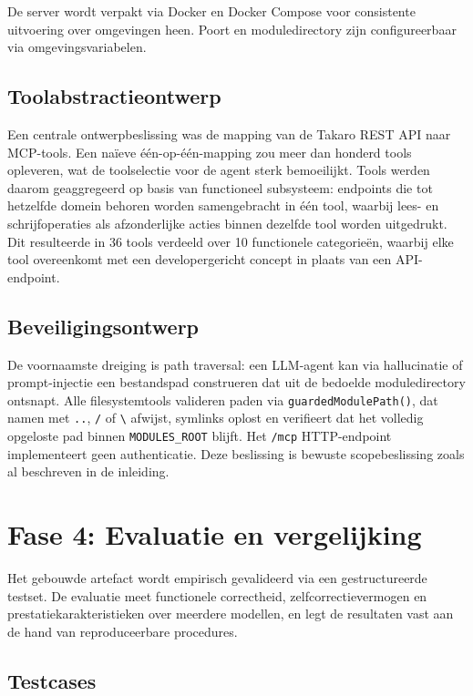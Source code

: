 De server wordt verpakt via Docker en Docker Compose voor consistente uitvoering over omgevingen heen. Poort en moduledirectory zijn configureerbaar via omgevingsvariabelen.

\subsection{Toolabstractieontwerp}\label{subsec:toolontwerp}

Een centrale ontwerpbeslissing was de mapping van de Takaro REST API naar MCP-tools. Een naïeve één-op-één-mapping zou meer dan honderd tools opleveren, wat de toolselectie voor de agent sterk bemoeilijkt. Tools werden daarom geaggregeerd op basis van functioneel subsysteem: endpoints die tot hetzelfde domein behoren worden samengebracht in één tool, waarbij lees- en schrijfoperaties als afzonderlijke acties binnen dezelfde tool worden uitgedrukt. Dit resulteerde in 36 tools verdeeld over 10 functionele categorieën, waarbij elke tool overeenkomt met een developergericht concept in plaats van een API-endpoint.

\subsection{Beveiligingsontwerp}\label{subsec:beveiliging}

De voornaamste dreiging is path traversal: een LLM-agent kan via hallucinatie of prompt-injectie een bestandspad construeren dat uit de bedoelde moduledirectory ontsnapt. Alle filesystemtools valideren paden via \texttt{guardedModulePath()}, dat namen met \texttt{..}, \texttt{/} of \texttt{\textbackslash} afwijst, symlinks oplost en verifieert dat het volledig opgeloste pad binnen \texttt{MODULES\_ROOT} blijft. Het \texttt{/mcp} HTTP-endpoint implementeert geen authenticatie. Deze beslissing is bewuste scopebeslissing zoals al beschreven in de inleiding.

\section{Fase 4: Evaluatie en vergelijking}\label{sec:fase4}

Het gebouwde artefact wordt empirisch gevalideerd via een gestructureerde testset. De evaluatie meet functionele correctheid, zelfcorrectievermogen en prestatiekarakteristieken over meerdere modellen, en legt de resultaten vast aan de hand van reproduceerbare procedures.

\subsection{Testcases}\label{subsec:testcases}

